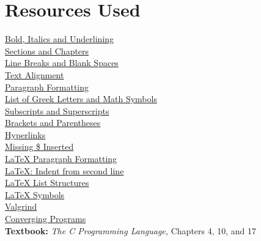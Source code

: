 \documentclass{article}
\begin{document}
\section{Resources Used}
\href{https://www.overleaf.com/learn/latex/Bold,_italics_and_underlining#Bold_text}{Bold, Italics and Underlining}
\\ \href{https://www.overleaf.com/learn/latex/Sections_and_chapters#Numbered_and_unnumbered_sections}{Sections and Chapters}
\\ \href{https://www.overleaf.com/learn/latex/Line_breaks_and_blank_spaces}{Line Breaks and Blank Spaces}
\\ \href{https://www.overleaf.com/learn/latex/Text_alignment}{Text Alignment}
\\ \href{https://www.overleaf.com/learn/latex/Paragraph_formatting#Starting_a_new_paragraph}{Paragraph Formatting}
\\ \href{https://www.overleaf.com/learn/latex/List_of_Greek_letters_and_math_symbols}{List of Greek Letters and Math Symbols}
\\ \href{https://www.overleaf.com/learn/latex/Subscripts_and_superscripts}{Subscripts and Superscripts}
\\ \href{https://www.overleaf.com/learn/latex/Brackets_and_Parentheses}{Brackets and Parentheses}
\\ \href{https://www.overleaf.com/learn/latex/Hyperlinks}{Hyperlinks}
\\ \href{https://www.overleaf.com/learn/latex/Errors/Missing_$_inserted\#Common_Causes}{Missing \$ Inserted}
\\ \href{https://en.wikibooks.org/wiki/LaTeX/Paragraph_Formatting}{LaTeX Paragraph Formatting}
\\ \href{https://stackoverflow.com/questions/3254054/latex-indent-from-second-line}{LaTeX: Indent from second line}
\\ \href{https://en.wikibooks.org/wiki/LaTeX/List_Structures}{LaTeX List Structures}
\\ \href{http://artofproblemsolving.com/wiki/index.php/LaTeX:Symbols}{LaTeX Symbols}
\\ \href{http://valgrind.org/info/}{Valgrind}
\\ \href{https://onlinelibrary.wiley.com/doi/pdf/10.1002/9783527618835.app5}{Converging Programs}
\\ \textbf{Textbook:} \textit{The C Programming Language,} Chapters 4, 10, and 17
\end{document}
